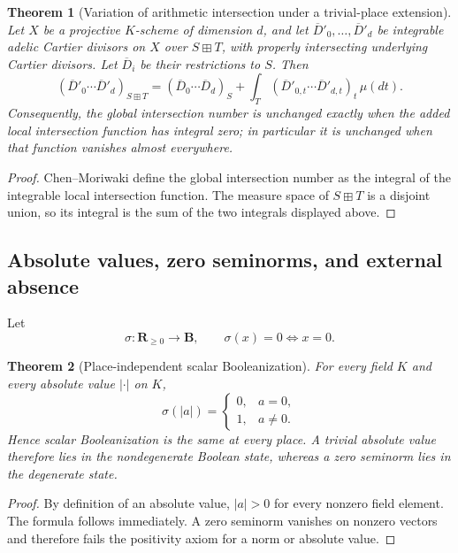 \documentclass[11pt]{amsart}
\numberwithin{equation}{section}
\newtheorem{theorem}{Theorem}[section]
\theoremstyle{definition}
\newcommand{\B}{\mathbf B}
\newcommand{\R}{\mathbf R}
\begin{document}
\begin{theorem}[Variation of arithmetic intersection under a trivial-place
extension]
\label{thm:intersection-trivial-place-variation}
Let $X$ be a projective $K$-scheme of dimension $d$, and let
$\overline D'_0,\dots,\overline D'_d$ be integrable adelic Cartier divisors
on $X$ over $S\boxplus T$, with properly intersecting underlying Cartier
divisors.  Let $\overline D_i$ be their restrictions to $S$.  Then
\[
(\overline D'_0\cdots\overline D'_d)_{S\boxplus T}
=
(\overline D_0\cdots\overline D_d)_S
+
\int_T
(\overline D'_{0,t}\cdots\overline D'_{d,t})_t\,\mu(dt).
\]
Consequently, the global intersection number is unchanged exactly when the
added local intersection function has integral zero; in particular it is
unchanged when that function vanishes almost everywhere.
\end{theorem}

\begin{proof}
Chen--Moriwaki define the global intersection number as the integral of the
integrable local intersection function.  The measure space of
$S\boxplus T$ is a disjoint union, so its integral is the sum of the two
integrals displayed above.
\end{proof}

\subsection{Absolute values, zero seminorms, and external absence}

Let
\[
\sigma:\R_{\geq0}\longrightarrow\B,
\qquad
\sigma(x)=0\iff x=0.
\]

\begin{theorem}[Place-independent scalar Booleanization]
\label{thm:absolute-value-boolean-no-go}
For every field $K$ and every absolute value $|\cdot|$ on $K$,
\[
\sigma(|a|)=
\begin{cases}
0,&a=0,\\
1,&a\neq0.
\end{cases}
\]
Hence scalar Booleanization is the same at every place.  A trivial absolute value therefore lies in the nondegenerate Boolean state, whereas a zero seminorm lies in the degenerate state.
\end{theorem}

\begin{proof}
By definition of an absolute value, $|a|>0$ for every nonzero field element.
The formula follows immediately.  A zero seminorm vanishes on nonzero
vectors and therefore fails the positivity axiom for a norm or absolute
value.
\end{proof}
\end{document}
